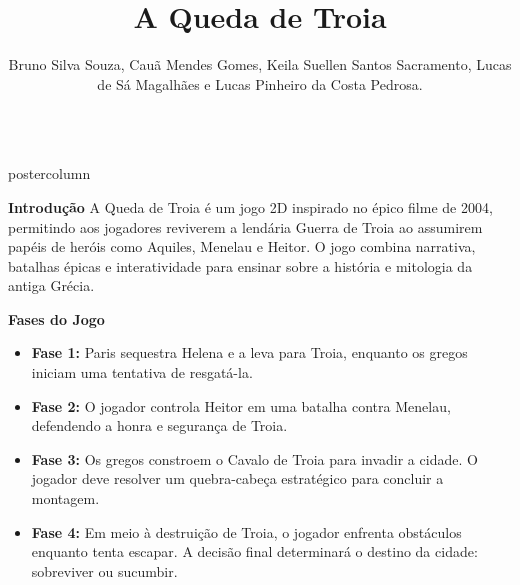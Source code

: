\documentclass[final,hyperref={pdfpagelabels=false}]{beamer}
\title{\Huge \textbf{A Queda de Troia}}
\author{Bruno Silva Souza, Cauã Mendes Gomes, Keila Suellen Santos Sacramento, Lucas de Sá Magalhães e Lucas Pinheiro da Costa Pedrosa.}
\institute[SENAC]{Centro Universitário Senac - Campus Santo Amaro}
\newlength{\columnheight}
\begin{document}
\begin{frame}
    \vspace{1cm}
    \begin{columns}
        \begin{column}{.49\textwidth}
            \begin{beamercolorbox}[center,wd=\textwidth]{postercolumn}
                \begin{minipage}[T]{.85\textwidth} 
                    \parbox[t][\columnheight]{\textwidth}{ 
                        \begin{block}{\textbf{Introdução}}
                            A Queda de Troia é um jogo 2D inspirado no épico filme de 2004, permitindo aos jogadores reviverem a lendária Guerra de Troia ao assumirem papéis de heróis como Aquiles, Menelau e Heitor. O jogo combina narrativa, batalhas épicas e interatividade para ensinar sobre a história e mitologia da antiga Grécia.
                        \end{block}
                        
                        \begin{block}{\textbf{Fases do Jogo}}
                            \begin{itemize}
                                \item \textbf{Fase 1:} Paris sequestra Helena e a leva para Troia, enquanto os gregos iniciam uma tentativa de resgatá-la.
                                \item \textbf{Fase 2:} O jogador controla Heitor em uma batalha contra Menelau, defendendo a honra e segurança de Troia.
                                \item \textbf{Fase 3:} Os gregos constroem o Cavalo de Troia para invadir a cidade. O jogador deve resolver um quebra-cabeça estratégico para concluir a montagem.
                                \item \textbf{Fase 4:} Em meio à destruição de Troia, o jogador enfrenta obstáculos enquanto tenta escapar. A decisão final determinará o destino da cidade: sobreviver ou sucumbir.
                            \end{itemize}
                        \end{block}
                        
}
\end{minipage}
\end{beamercolorbox}
\end{column}
\end{columns}
\end{frame}
\end{document}
